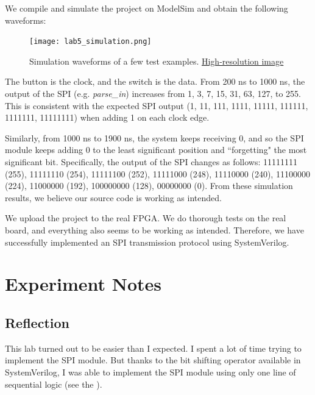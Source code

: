 \documentclass[12pt]{article}
\begin{document}
We compile and simulate the project on ModelSim and obtain the following waveforms:

\begin{figure}[ht]
  \centering
  \texttt{[image: lab5\_simulation.png]}
  \caption{Simulation waveforms of a few test examples. \href{https://i.imgur.com/XwiPTrR.jpg}{High-resolution image}}
  \label{figure:3}
\end{figure}

\newpage

The button is the clock, and the switch is the data. From 200 ns to 1000 ns, the output of the SPI (e.g. \textit{parse\_in}) increases from 1, 3, 7, 15, 31, 63, 127, to 255. This is consistent with the expected SPI output (1, 11, 111, 1111, 11111, 111111, 1111111, 11111111) when adding 1 on each clock edge.

Similarly, from 1000 ns to 1900 ns, the system keeps receiving 0, and so the SPI module keeps adding 0 to the least significant position and ``forgetting" the most significant bit. Specifically, the output of the SPI changes as follows: 11111111 (255), 11111110 (254), 11111100 (252), 11111000 (248), 11110000 (240), 11100000 (224), 11000000 (192), 100000000 (128), 00000000 (0). From these simulation results, we believe our source code is working as intended.

We upload the project to the real FPGA. We do thorough tests on the real board, and everything also seems to be working as intended. Therefore, we have successfully implemented an SPI transmission protocol using SystemVerilog.

\section{Experiment Notes}

\subsection*{Reflection}

This lab turned out to be easier than I expected. I spent a lot of time trying to implement the SPI module. But thanks to the bit shifting operator available in SystemVerilog, I was able to implement the SPI module using only one line of sequential logic (see the ).
\end{document}
